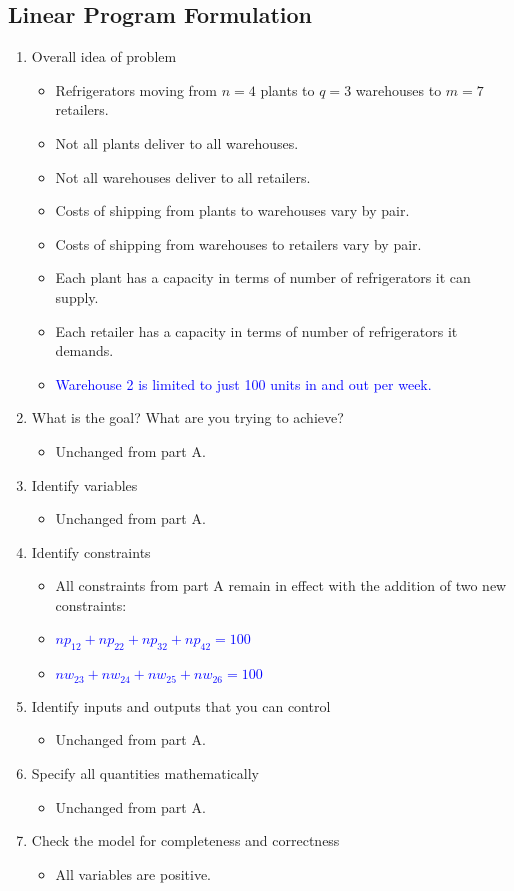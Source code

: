 \documentclass[../report/main.tex]{subfiles}
\begin{document}
\subsection*{Linear Program Formulation}
\begin{enumerate}[1.]
	\item Overall idea of problem
	\begin{itemize}
		\item Refrigerators moving from $n=4$ plants to $q=3$ warehouses to $m=7$ retailers.
		\item Not all plants deliver to all warehouses.
		\item Not all warehouses deliver to all retailers.
		\item Costs of shipping from plants to warehouses vary by pair.
		\item Costs of shipping from warehouses to retailers vary by pair.
		\item Each plant has a capacity in terms of number of refrigerators it can supply.
		\item Each retailer has a capacity in terms of number of refrigerators it demands.
		\item\textcolor{blue}{Warehouse 2 is limited to just 100 units in and out per week.}		
	\end{itemize}
	\item What is the goal?  What are you trying to achieve?
	\begin{itemize}
		\item Unchanged from part A.
	\end{itemize}
	\item Identify variables
	\begin{itemize}
		\item Unchanged from part A.
	\end{itemize}
	\item Identify constraints
	\begin{itemize}
		\item All constraints from part A remain in effect with the addition of two new constraints:
		\item\textcolor{blue}{$np_{12} + np_{22} + np_{32} + np_{42} = 100$}		
		\item\textcolor{blue}{$nw_{23} + nw_{24} + nw_{25} + nw_{26} = 100$}		
	\end{itemize}
	\item Identify inputs and outputs that you can control
	\begin{itemize}
		\item Unchanged from part A.
	\end{itemize}
	\item Specify all quantities mathematically
	\begin{itemize}
		\item Unchanged from part A.
	\end{itemize}
	\item Check the model for completeness and correctness
	\begin{itemize}
	\item All variables are positive.
	\end{itemize}
\end{enumerate}
\end{document}
